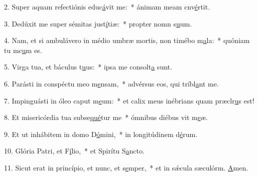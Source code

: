 2. Super aquam refectiónis educ\uline{á}vit me:~* ánimam meam cnv\uline{é}rtit.\par 
3. Dedúxit me super sémitas just\uline{í}tiæ:~* propter nomn s\uline{u}um.\par 
4. Nam, et si ambulávero in médio umbræ mortis, non timébo m\uline{a}la:~* quóniam tu mc\uline{u}m es.\par 
5. Virga tua, et báculus t\uline{u}us:~* ipsa me consolt\uline{a} sunt.\par 
6. Parásti in conspéctu meo m\uline{e}nsam,~* advérsus eos, qui tríbl\uline{a}nt me.\par 
7. Impinguásti in óleo caput m\uline{e}um:~* et calix meus inébrians quam præclr\uline{u}s est!\par 
8. Et misericórdia tua subse\uline{qué}tur me~* ómnibus diébus vit m\uline{e}æ.\par 
9. Et ut inhábitem in domo D\uline{ó}mini,~* in longitúdinem d\uline{é}rum.\par 
10. Glória Patri, et F\uline{í}lio,~* et Spirítu S\uline{a}ncto.\par 
11. Sicut erat in princípio, et nunc, et s\uline{e}mper,~* et in sǽcula sæculórm. \uline{A}men.\par 
